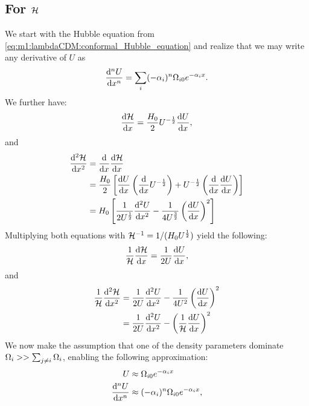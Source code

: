 \subsection{For $\mathcal{H}$}
    We start with the Hubble equation from \cref{eq:m1:lambdaCDM:conformal_Hubble_equation} and realize that we may write any derivative of $U$ as
    \begin{equation}
        \dv[n]{U}{x} = \sum_i(-\alpha_i)^n\Omega_{i0}e^{-\alpha_ix}.
    \end{equation}
    We further have:
    \begin{equation}
        \dv{\mathcal{H}}{x} = \frac{H_0}{2}U^{-\frac{1}{2}}\dv{U}{x},
    \end{equation}
    and
    \begin{equation}
        \begin{split}
            \dv[2]{\mathcal{H}}{x} &= \dv{}{x}\dv{\mathcal{H}}{x}\\
            &= \frac{H_0}{2}\left[\dv{U}{x}\left(\dv{}{x}U^{-\frac{1}{2}}\right) + U^{-\frac{1}{2}}\left(\dv{}{x}\dv{U}{x}\right)\right]\\
            &=H_0\left[\frac{1}{2U^{\frac{1}{2}}}\dv[2]{U}{x} - \frac{1}{4U^{\frac{3}{2}}}\left(\dv{U}{x}\right)^2\right]
        \end{split}
    \end{equation}
    Multiplying both equations with $\mathcal{H}^{-1} = 1/(H_0U^{\frac{1}{2}})$ yield the following:
    \begin{equation}
        \frac{1}{\mathcal{H}}\dv{\mathcal{H}}{x} = \frac{1}{2U}\dv{U}{x},
    \end{equation}
    and 
    \begin{equation}
        \begin{split}
            \frac{1}{\mathcal{H}}\dv[2]{\mathcal{H}}{x} &= \frac{1}{2U}\dv[2]{U}{x} - \frac{1}{4U^2}\left(\dv{U}{x}\right)^2 \\
            &= \frac{1}{2U}\dv[2]{U}{x}-\left(\frac{1}{\mathcal{H}}\dv{U}{x}\right)^2
        \end{split}
    \end{equation}
    We now make the assumption that one of the density parameters dominate $\Omega_i>> \sum_{j\neq i}\Omega_i$, enabling the following approximation:
    \begin{equation}
        \begin{split}
            U &\approx \Omega_{i0}e^{-\alpha_ix} \\
            \dv[n]{U}{x} &\approx (-\alpha_i)^n\Omega_{i0}e^{-\alpha_ix},
        \end{split}
    \end{equation}
